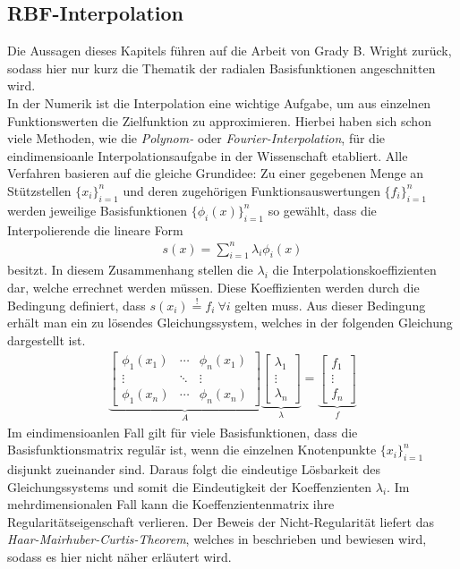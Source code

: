 \documentclass[12pt,titlepage]{article}
\begin{document}
\subsection{RBF-Interpolation}\label{sec:rbf_inter}
Die Aussagen dieses Kapitels führen auf die Arbeit von Grady B. Wright \cite{wright2003radial} zurück, sodass  hier nur kurz die Thematik der radialen Basisfunktionen angeschnitten wird.\\
In der Numerik ist die Interpolation eine wichtige Aufgabe, um aus einzelnen Funktionswerten die Zielfunktion zu approximieren. Hierbei haben sich schon viele Methoden, wie die \textit{Polynom-} oder \textit{Fourier-Interpolation}, für die eindimensioanle Interpolationsaufgabe in der Wissenschaft etabliert. Alle Verfahren basieren auf die gleiche Grundidee: Zu einer gegebenen Menge an Stützstellen $\{x_i\}_{i=1}^n$ und deren zugehörigen Funktionsauswertungen $\{f_i\}_{i=1}^n$ werden jeweilige Basisfunktionen $\{\phi_i(x)\}_{i=1}^n$ so gewählt, dass die Interpolierende die lineare Form
\begin{align}
 s(x)=\sum_{i=1}^n\lambda_i\phi_i(x)
\end{align}
besitzt. In diesem Zusammenhang stellen die $\lambda_i$ die Interpolationskoeffizienten dar, welche errechnet werden müssen. Diese Koeffizienten werden durch die Bedingung definiert, dass $s(x_i)\overset{!}{=}f_i~\forall i$ gelten muss. Aus dieser Bedingung erhält man ein zu lösendes Gleichungssystem, welches in der folgenden Gleichung dargestellt ist.
\begin{align}
\underbrace{\begin{bmatrix}
 \phi_1(x_1) & \cdots & \phi_n(x_1) \\ \vdots & \ddots & \vdots \\ \phi_1(x_n) & \cdots & \phi_n(x_n)
\end{bmatrix}}_{A}
\underbrace{\begin{bmatrix}
 \lambda_1 \\ \vdots \\ \lambda_n
\end{bmatrix}}_{\lambda}
=
\underbrace{\begin{bmatrix}
 f_1 \\ \vdots \\ f_n
\end{bmatrix}}_{f}\label{eq:Intermatrix}
\end{align}
Im eindimensioanlen Fall gilt für viele Basisfunktionen, dass die Basisfunktionsmatrix regulär ist, wenn die einzelnen Knotenpunkte $\{x_i\}_{i=1}^n$ disjunkt zueinander sind. Daraus folgt die eindeutige Lösbarkeit des Gleichungssystems und somit die Eindeutigkeit der Koeffenzienten $\lambda_i$. Im mehrdimensionalen Fall kann die Koeffenzientenmatrix ihre Regularitätseigenschaft verlieren. Der Beweis der Nicht-Regularität liefert das \textit{Haar-Mairhuber-Curtis-Theorem}, welches in \cite{de2013four} beschrieben und bewiesen wird, sodass es hier nicht näher erläutert wird.\\
\end{document}
